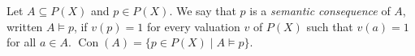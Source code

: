 Let $A \subseteq P(X)$ and $p \in P(X)$. We say that $p$ is a \emph{semantic consequence} of $A$, written $A \models p$, if $v(p) = 1$ for every valuation $v$ of $P(X)$ such that $v(a) = 1$ for all $a \in A$. $\operatorname{Con}(A) = \{p \in P(X) \mid A \models p\}$.
